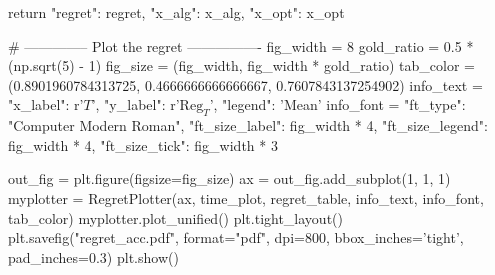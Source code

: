         return {"regret": regret, "x_alg": x_alg, "x_opt": x_opt}

    
# -------------- Plot the regret ----------------
fig_width = 8
gold_ratio = 0.5 * (np.sqrt(5) - 1)
fig_size = (fig_width, fig_width * gold_ratio)
tab_color = (0.8901960784313725, 0.4666666666666667, 0.7607843137254902)
info_text = {"x_label": r'$T$',
             "y_label": r'$\mathrm{Reg}_T$',
             "legend": 'Mean'}
info_font = {"ft_type": "Computer Modern Roman",
             "ft_size_label": fig_width * 4, "ft_size_legend": fig_width * 4, "ft_size_tick": fig_width * 3}


out_fig = plt.figure(figsize=fig_size)
ax = out_fig.add_subplot(1, 1, 1)
myplotter = RegretPlotter(ax, time_plot, regret_table, 
                          info_text, info_font, tab_color)
myplotter.plot_unified()
plt.tight_layout()
plt.savefig("regret_acc.pdf", format="pdf",
            dpi=800, bbox_inches='tight', pad_inches=0.3)
plt.show()